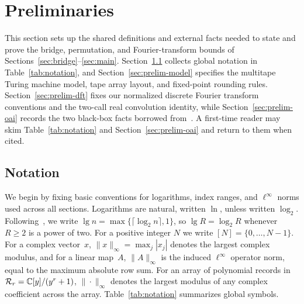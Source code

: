 \setlength{\textfloatsep}{20.0pt plus 2.0pt minus 4.0pt}
\setlength{\intextsep}{12.0pt plus 2.0pt minus 2.0pt}
\section{Preliminaries}\label{sec:prelim}

This section sets up the shared definitions and external facts needed to state and prove the bridge, permutation, and Fourier-transform bounds of Sections~\ref{sec:bridge}--\ref{sec:main}. Section~\ref{sec:notation} collects global notation in Table~\ref{tab:notation}, and Section~\ref{sec:prelim-model} specifies the multitape Turing machine model, tape array layout, and fixed-point rounding rules. Section~\ref{sec:prelim-dft} fixes our normalized discrete Fourier transform conventions and the two-call real convolution identity, while Section~\ref{sec:prelim-oai} records the two black-box facts borrowed from~\cite{OAI26}. A first-time reader may skim Table~\ref{tab:notation} and Section~\ref{sec:prelim-oai} and return to them when cited.

\subsection{Notation}\label{sec:notation}

We begin by fixing basic conventions for logarithms, index ranges, and $\ell^\infty$ norms used across all sections. Logarithms are natural, written $\ln$, unless written $\log_2$. Following~\cite{OAI26}, we write $\lg n=\max\{\lceil\log_2 n\rceil,1\}$, so $\lg R=\log_2 R$ whenever $R\ge 2$ is a power of two. For a positive integer $N$ we write $[N]=\{0,\dots,N-1\}$. For a complex vector~$x$, $\|x\|_\infty=\max_j|x_j|$ denotes the largest complex modulus, and for a linear map~$A$, $\|A\|_\infty$ is the induced $\ell^\infty$ operator norm, equal to the maximum absolute row sum. For an array of polynomial records in $\mathcal{R}_r=\mathbb{C}[y]/(y^r+1)$, $\|\cdot\|_\infty$ denotes the largest modulus of any complex coefficient across the array. Table~\ref{tab:notation} summarizes global symbols.

